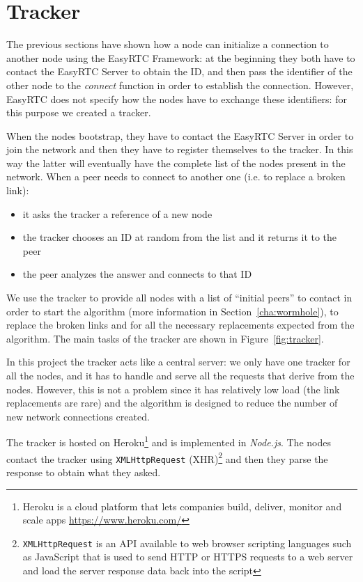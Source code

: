 \chapter{Tracker}
\label{cha:tracker}

The previous sections have shown how a node can initialize a connection to another node using the EasyRTC Framework: at the beginning they both have to contact the EasyRTC Server to obtain the ID, and then pass the identifier of the other node to the \textit{connect} function in order to establish the connection. However, EasyRTC does not specify how the nodes have to exchange these identifiers: for this purpose we created a tracker. 

When the nodes bootstrap, they have to contact the EasyRTC Server in order to join the network and then they have to register themselves to the tracker. In this way the latter will eventually have the complete list of the nodes present in the network. When a peer needs to connect to another one (i.e. to replace a broken link):
\begin{itemize}
	\item it asks the tracker a reference of a new node
	\item the tracker chooses an ID at random from the list and it returns it to the peer
	\item the peer analyzes the answer and connects to that ID
\end{itemize}

We use the tracker to provide all nodes with a list of ``initial peers'' to contact in order to start the algorithm (more information in Section~\ref{cha:wormhole}), to replace the broken links and for all the necessary replacements expected from the algorithm. The main tasks of the tracker are shown in Figure~\ref{fig:tracker}.

In this project the tracker acts like a central server: we only have one tracker for all the nodes, and it has to handle and serve all the requests that derive from the nodes. However, this is not a problem since it has relatively low load (the link replacements are rare) and the algorithm is designed to reduce the number of new network connections created. 

The tracker is hosted on Heroku\footnote{Heroku is a cloud platform that lets companies build, deliver, monitor and scale apps \url{https://www.heroku.com/}} and is implemented in \textit{Node.js}. The nodes contact the tracker using \texttt{XMLHttpRequest} (XHR)\footnote{\texttt{XMLHttpRequest} is an API available to web browser scripting languages such as JavaScript that is used to send HTTP or HTTPS requests to a web server and load the server response data back into the script} and then they parse the response to obtain what they asked.

